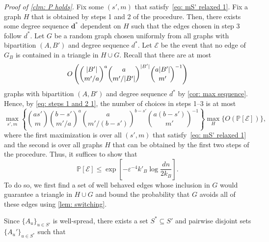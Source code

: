 \documentclass[11pt]{article}
\newcommand{\eps}{\varepsilon}
\def\P{\mathbb P}
\theoremstyle{plain}
\begin{document}
\noindent\textit{Proof of \cref{clm: P holds}.} 
Fix some $(s', m)$ that satisfy~\eqref{eq: mS' relaxed 1}. Fix a graph $H$ that is obtained by steps 1 and 2 of the procedure. Then, there exists some degree sequence $\mathbf d^*$ dependent on $H$ such that the edges chosen in step 3 follow $d^*$. Let $G$ be a random graph chosen uniformly from all graphs with bipartition $(A, B')$ and degree sequence $d^*$. Let $\mathcal E$ be the event that no edge of $G_B$ is contained in a triangle in $H \cup G$. Recall that there are at most \begin{equation}
    O\left(\binom{|B'|}{m'/a}^a\binom{a}{m'/|B'|}^{|B'|}\binom{a|B'|}{m'}^{-1}\right)\notag
\end{equation}
graphs with bipartition $(A,B')$ and degree sequence $d^*$ by \cref{cor: max sequence}. Hence, by \eqref{eq: steps 1 and 2 1}, the number of choices in steps 1--3 is at most 
\begin{equation}
    \max_{s', m}\left\{ \binom{as'}{m}\binom{b - s'}{m'/a}^a\binom{a}{m'/(b - s')}^{b-s'}\binom{a(b - s')}{m'}^{-1} \right\}\max_{H}\{O(\P[\mathcal E])\},
\end{equation}
where the first maximization is over all $(s', m)$ that satisfy~\eqref{eq: mS' relaxed 1} and the second is over all graphs $H$ that can be obtained by the first two steps of the procedure. Thus, it suffices to show that 
\begin{equation}\label{eq: desired prob small torso small k}
    \P[\mathcal E] \leq \exp\left[-\eps^{-4}k'_B\log\frac{dn}{2k_B}\right].
\end{equation}
To do so, we first find a set of well behaved edges whose inclusion in $G$ would guarantee a triangle in $H \cup G$ and bound the probability that $G$ avoids all of these edges using \cref{lem: switching}.

Since $\{A_u\}_{u \in S'}$ is well-spread, there exists a set $S^* \subseteq S'$ and pairwise disjoint sets $\{A_u'\}_{u \in S^*}$ such that 
\end{document}
